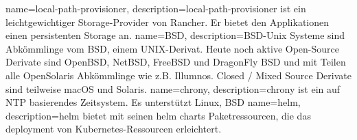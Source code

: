 {
        name=local-path-provisioner,
        description={local-path-provisioner ist ein leichtgewichtiger Storage-Provider von Rancher.
        Er bietet den Applikationen einen persistenten Storage an.}
}
{
        name=BSD,
        description={BSD-Unix Systeme sind Abkömmlinge vom BSD, einem \Gls{UNIX}-Derivat.
        Heute noch aktive Open-Source Derivate sind OpenBSD, NetBSD, FreeBSD und DragonFly BSD und mit Teilen alle OpenSolaris Abkömmlinge wie z.B. Illumnos.
        Closed / Mixed Source Derivate sind teilweise macOS und Solaris.}
}
{
        name=chrony,
        description={chrony ist ein auf NTP basierendes Zeitsystem.
        Es unterstützt \Gls{Linux}, \Gls{BSD}}
}
{
        name=helm,
        description={helm bietet mit seinen helm charts Paketressourcen, die das deployment von \Gls{Kubernetes}}-Ressourcen erleichtert\cite{5846A5VX}.
}
